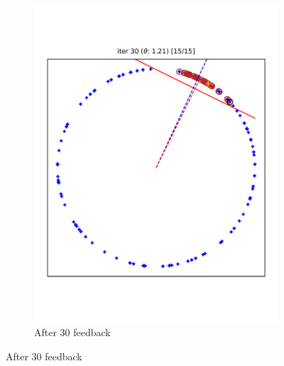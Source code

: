\documentclass{article} %
\begin{document}
\begin{figure}
\begin{subfigure}{0.30\textwidth}
		\includegraphics[width=\textwidth, clip=true, trim=12mm 40mm 12mm 35mm]{iter_30}
		\caption{After 30 feedback}
		\label{fig:iter_30}
	\end{subfigure}

\end{figure}
\end{document}
